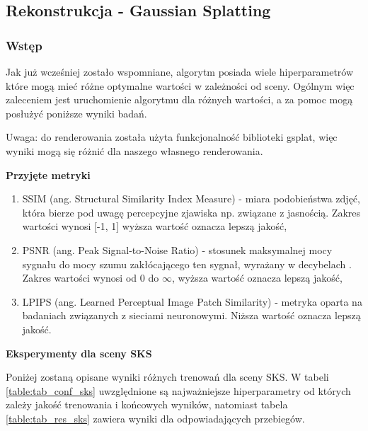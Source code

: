 \subsection{Rekonstrukcja - Gaussian Splatting}

\subsubsection{Wstęp}
Jak już wcześniej zostało wspomniane, algorytm posiada wiele hiperparametrów które mogą mieć różne optymalne wartości w zależności od sceny. Ogólnym więc zaleceniem jest uruchomienie algorytmu dla różnych wartości, a za pomoc mogą posłużyć poniższe wyniki badań. 

Uwaga: do renderowania została użyta funkcjonalność biblioteki gsplat, więc wyniki mogą się różnić dla naszego własnego renderowania. 

\textbf{Przyjęte metryki}
\begin{enumerate}
    \item SSIM (ang. Structural Similarity Index Measure) - miara podobieństwa zdjęć, która bierze pod uwagę percepcyjne zjawiska np. związane z jasnością. Zakres wartości wynosi [-1, 1] wyższa wartość oznacza lepszą jakość,
    \item PSNR (ang. Peak Signal-to-Noise Ratio) - stosunek maksymalnej mocy sygnału do mocy szumu zakłócającego ten sygnał, wyrażany w decybelach . Zakres wartości wynosi od 0 do $\infty$, wyższa wartość oznacza lepszą jakość,
    \item LPIPS (ang. Learned Perceptual Image Patch Similarity) - metryka oparta na badaniach związanych z sieciami neuronowymi. Niższa wartość oznacza lepszą jakość. 
\end{enumerate}

\textbf{Eksperymenty dla sceny SKS}

Poniżej zostaną opisane wyniki różnych trenowań dla sceny SKS. W tabeli \ref{table:tab_conf_sks} uwzględnione są najważniejsze hiperparametry od których zależy jakość trenowania i końcowych wyników, natomiast tabela \ref{table:tab_res_sks} zawiera wyniki dla odpowiadających przebiegów. 


